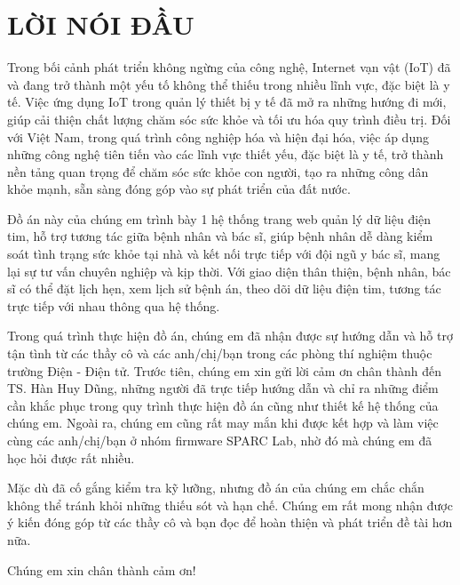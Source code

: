 \section*{LỜI NÓI ĐẦU} %
\thispagestyle{empty}
Trong bối cảnh phát triển không ngừng của công nghệ, 
Internet vạn vật (IoT) đã và đang trở thành một yếu tố không thể thiếu trong nhiều lĩnh vực, đặc biệt là y tế. 
Việc ứng dụng IoT trong quản lý thiết bị y tế đã mở ra những hướng đi mới, 
giúp cải thiện chất lượng chăm sóc sức khỏe và tối ưu hóa quy trình điều trị. 
Đối với Việt Nam, trong quá trình công nghiệp hóa và hiện đại hóa, 
việc áp dụng những công nghệ tiên tiến vào các lĩnh vực thiết yếu, đặc biệt là y tế, 
trở thành nền tảng quan trọng để chăm sóc sức khỏe con người, tạo ra những công dân khỏe mạnh, sẵn sàng đóng góp vào sự phát triển của đất nước.

Đồ án này của chúng em trình bày 1 hệ thống trang web quản lý dữ liệu điện tim, hỗ trợ tương tác giữa bệnh nhân và bác sĩ,
giúp bệnh nhân dễ dàng kiểm soát tình trạng sức khỏe tại nhà và
kết nối trực tiếp với đội ngũ y bác sĩ, mang lại sự tư vấn chuyên nghiệp và kịp thời. 
Với giao diện thân thiện, bệnh nhân, bác sĩ có thể đặt lịch hẹn, xem lịch sử bệnh án, theo dõi dữ liệu điện tim,
tương tác trực tiếp với nhau thông qua hệ thống. 

Trong quá trình thực hiện đồ án, chúng em đã nhận được sự hướng dẫn và hỗ trợ tận tình từ các thầy cô và các anh/chị/bạn 
trong các phòng thí nghiệm thuộc trường Điện - Điện tử. Trước tiên, chúng em xin gửi lời cảm ơn chân thành đến TS. Hàn Huy Dũng, 
những người đã trực tiếp hướng dẫn và chỉ ra những điểm cần khắc phục trong quy trình thực hiện đồ án cũng như thiết kế hệ thống của chúng em. 
Ngoài ra, chúng em cũng rất may mắn khi được kết hợp và làm việc cùng các anh/chị/bạn ở nhóm firmware SPARC Lab, nhờ đó mà chúng em đã học hỏi được rất nhiều.

Mặc dù đã cố gắng kiểm tra kỹ lưỡng, nhưng đồ án của chúng em chắc chắn không thể tránh khỏi những thiếu sót và hạn chế. 
Chúng em rất mong nhận được ý kiến đóng góp từ các thầy cô và bạn đọc để hoàn thiện và phát triển đề tài hơn nữa.



Chúng em xin chân thành cảm ơn! 



\cleardoublepage
